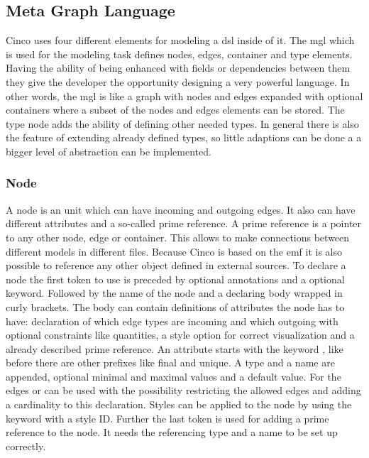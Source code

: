 \subsection{Meta Graph Language}

Cinco uses four different elements for modeling a \gls{dsl} inside of it. The \gls{mgl} which is used for the modeling task defines nodes, edges, container and type elements. Having the ability of being enhanced with fields or dependencies between them they give the developer the opportunity designing a very powerful language. In other words, the \gls{mgl} is like a graph with nodes and edges expanded with optional containers where a subset of the nodes and edges elements can be stored. The type node adds the ability of defining other needed types. In general there is also the feature of extending already defined types, so little adaptions can be done a a bigger level of abstraction can be implemented.

\subsubsection{Node}

A node is an unit which can have incoming and outgoing edges. It also can have different attributes and a so-called prime reference. A prime reference is a pointer to any other node, edge or container. This allows to make connections between different models in different files. Because Cinco is based on the \gls{emf} it is also possible to reference any other object defined in external sources. To declare a node the first token to use is  preceded by optional annotations and a optional  keyword. Followed by the name of the node and a declaring body wrapped in curly brackets. The body can contain definitions of attributes the node has to have: declaration of which edge types are incoming and which outgoing with optional constraints like quantities, a style option for correct visualization and a already described prime reference. An attribute starts with the keyword , like before there are other prefixes like final and unique. A type and a name are appended, optional minimal and maximal values and a default value. For the edges  or  can be used with the possibility restricting the allowed edges and adding a cardinality to this declaration. Styles can be applied to the node by using the  keyword with a style ID.
Further the last token  is used for adding a prime reference to the node. It needs the referencing type and a name to be set up correctly.


